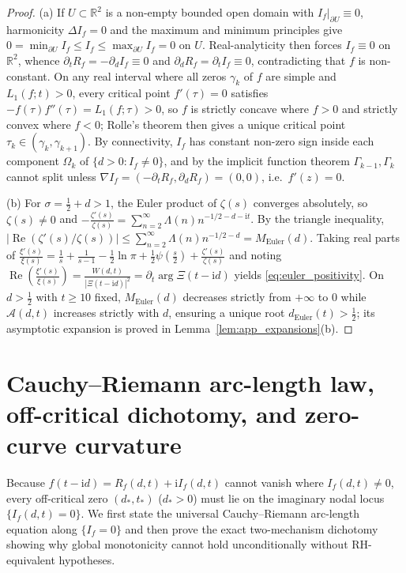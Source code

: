 \documentclass[11pt,a4paper,reqno]{amsart}
\theoremstyle{definition}
\theoremstyle{remark}
\numberwithin{equation}{section}
\newcommand{\ii}{\mathrm{i}}
\newcommand{\Rea}{\operatorname{Re}}
\begin{document}
\begin{proof}
(a) If $U \subset \mathbb{R}^2$ is a non-empty bounded open domain with $I_f|_{\partial U} \equiv 0$, harmonicity $\Delta I_f = 0$ and the maximum and minimum principles give $0 = \min_{\partial U} I_f \le I_f \le \max_{\partial U} I_f = 0$ on $U$. Real-analyticity then forces $I_f \equiv 0$ on $\mathbb{R}^2$, whence $\partial_t R_f = -\partial_d I_f \equiv 0$ and $\partial_d R_f = \partial_t I_f \equiv 0$, contradicting that $f$ is non-constant. On any real interval where all zeros $\gamma_k$ of $f$ are simple and $L_1(f;t) > 0$, every critical point $f'(\tau) = 0$ satisfies $-f(\tau)f''(\tau) = L_1(f;\tau) > 0$, so $f$ is strictly concave where $f > 0$ and strictly convex where $f < 0$; Rolle's theorem then gives a unique critical point $\tau_k \in (\gamma_k, \gamma_{k+1})$. By connectivity, $I_f$ has constant non-zero sign inside each component $\Omega_k$ of $\{d > 0 : I_f \neq 0\}$, and by the implicit function theorem $\Gamma_{k-1}, \Gamma_k$ cannot split unless $\nabla I_f = (-\partial_t R_f, \partial_d R_f) = (0,0)$, i.e.\ $f'(z) = 0$.

(b) For $\sigma = \frac{1}{2}+d > 1$, the Euler product of $\zeta(s)$ converges absolutely, so $\zeta(s) \neq 0$ and $-\frac{\zeta'(s)}{\zeta(s)} = \sum_{n=2}^\infty \Lambda(n)n^{-1/2-d-\ii t}$. By the triangle inequality, $|\Rea(\zeta'(s)/\zeta(s))| \le \sum_{n=2}^\infty \Lambda(n)n^{-1/2-d} = M_{\mathrm{Euler}}(d)$. Taking real parts of $\frac{\xi'(s)}{\xi(s)} = \frac{1}{s} + \frac{1}{s-1} - \frac{1}{2}\ln\pi + \frac{1}{2}\psi(\frac{s}{2}) + \frac{\zeta'(s)}{\zeta(s)}$ and noting $\Rea(\frac{\xi'(s)}{\xi(s)}) = \frac{W(d,t)}{|\Xi(t-\ii d)|^2} = \partial_t\arg\Xi(t-\ii d)$ yields \eqref{eq:euler_positivity}. On $d > \frac{1}{2}$ with $t \ge 10$ fixed, $M_{\mathrm{Euler}}(d)$ decreases strictly from $+\infty$ to $0$ while $\mathcal{A}(d,t)$ increases strictly with $d$, ensuring a unique root $d_{\mathrm{Euler}}(t) > \frac{1}{2}$; its asymptotic expansion is proved in Lemma~\ref{lem:app_expansions}(b).
\end{proof}

\section{Cauchy--Riemann arc-length law, off-critical dichotomy, and zero-curve curvature}\label{sec:monotonicity_curvature}

Because $f(t-\ii d) = R_f(d,t) + \ii I_f(d,t)$ cannot vanish where $I_f(d,t) \neq 0$, every off-critical zero $(d_*,t_*)$ ($d_* > 0$) must lie on the imaginary nodal locus $\{I_f(d,t) = 0\}$. We first state the universal Cauchy--Riemann arc-length equation along $\{I_f = 0\}$ and then prove the exact two-mechanism dichotomy showing why global monotonicity cannot hold unconditionally without RH-equivalent hypotheses.
\end{document}
